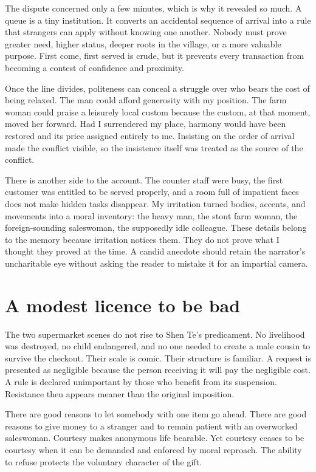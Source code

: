 ﻿\documentclass[12pt,a4paper]{book}
\begin{document}
The dispute concerned only a few minutes, which is why it revealed so much.
A queue is a tiny institution.  It converts an accidental sequence of arrival
into a rule that strangers can apply without knowing one another.  Nobody must
prove greater need, higher status, deeper roots in the village, or a more
valuable purpose.  First come, first served is crude, but it prevents every
transaction from becoming a contest of confidence and proximity.

Once the line divides, politeness can conceal a struggle over who bears the
cost of being relaxed.  The man could afford generosity with my position.  The
farm woman could praise a leisurely local custom because the custom, at that
moment, moved her forward.  Had I surrendered my place, harmony would have
been restored and its price assigned entirely to me.  Insisting on the order
of arrival made the conflict visible, so the insistence itself was treated as
the source of the conflict.

There is another side to the account.  The counter staff were busy, the first
customer was entitled to be served properly, and a room full of impatient
faces does not make hidden tasks disappear.  My irritation turned bodies,
accents, and movements into a moral inventory: the heavy man, the stout farm
woman, the foreign-sounding saleswoman, the supposedly idle colleague.  These
details belong to the memory because irritation notices them.  They do not
prove what I thought they proved at the time.  A candid anecdote should retain
the narrator's uncharitable eye without asking the reader to mistake it for an
impartial camera.

\section{A modest licence to be bad}

The two supermarket scenes do not rise to Shen Te's predicament.  No livelihood
was destroyed, no child endangered, and no one needed to create a male cousin
to survive the checkout.  Their scale is comic.  Their structure is familiar.
A request is presented as negligible because the person receiving it will pay
the negligible cost.  A rule is declared unimportant by those who benefit from
its suspension.  Resistance then appears meaner than the original imposition.

There are good reasons to let somebody with one item go ahead.  There are good
reasons to give money to a stranger and to remain patient with an overworked
saleswoman.  Courtesy makes anonymous life bearable.  Yet courtesy ceases to
be courtesy when it can be demanded and enforced by moral reproach.  The
ability to refuse protects the voluntary character of the gift.
\end{document}
